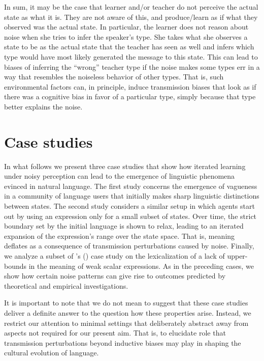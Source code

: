 \documentclass[10pt,a4paper]{article}
\newcommand{\citeposs}[2][]{\citeauthor{#2}'s (\citeyear[#1]{#2})}
\begin{document}
In sum, it may be the case that learner and/or teacher do not perceive the actual state as what it is. They are not aware of this, and produce/learn as if what they observed was the actual state. In particular, the learner does not reason about noise when she tries to infer the speaker's type. She takes what she observes a state to be as the actual state that the teacher has seen as well and infers which type would have most likely generated the message to this state. This can lead to biases of inferring the ``wrong'' teacher type if the noise makes some types err in a way that resembles the noiseless behavior of other types. That is, such environmental factors can, in principle, induce transmission biases that look as if there was a cognitive bias in favor of a particular type, simply because that type better explains the noise.


\section{Case studies}
In what follows we present three case studies that show how iterated learning under noisy perception can lead to the emergence of linguistic phenomena evinced in natural language. The first study concerns the emergence of vagueness in a community of language users that initially makes sharp linguistic distinctions between states. The second study considers a similar setup in which agents start out by using an expression only for a small subset of states. Over time, the strict boundary set by the initial language is shown to relax, leading to an iterated expansion of the expression's range over the state space. That is, meaning deflates as a consequence of transmission perturbations caused by noise. Finally, we analyze a subset of \citeposs{brochhagen+etal:2016:CogSci} case study on the lexicalization of a lack of upper-bounds in the meaning of weak scalar expressions. As in the preceding cases, we show how certain noise patterns can give rise to outcomes predicted by theoretical and empirical investigations. 

It is important to note that we do not mean to suggest that these case studies deliver a definite answer to the question how these properties arise. Instead, we restrict our attention to minimal settings that deliberately abstract away from aspects not required for our present aim. That is, to elucidate role that transmission perturbations beyond inductive biases may play in shaping the cultural evolution of language.%
\end{document}
